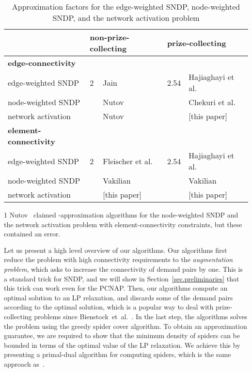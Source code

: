 \documentclass[11pt]{article}
\begin{document}
\begin{table*}
\centering
\caption{Approximation factors for the edge-weighted SNDP, node-weighted SNDP, and 
the network activation problem}
\label{table.results}

\begin{threeparttable}
\begin{tabular}{lllll}
\toprule
 & \multicolumn{2}{l}{non-prize-collecting} & \multicolumn{2}{l}{prize-collecting}\\
\midrule
{\bf edge-connectivity}&&&&\\
edge-weighted SNDP & 2 & Jain~\cite{Jain01} & 2.54 & Hajiaghayi et al.~\cite{HajiaghayiKKN12} \\
node-weighted SNDP & 
	 & Nutov~\cite{Nutov10node-weights} 
	&  & Chekuri et al.~\cite{ChekuriEV12}\\
network activation & 
	 & Nutov~\cite{Nutov13activation}
	&  & [this paper]\\
\midrule
{\bf element-connectivity}&&&&\\
edge-weighted SNDP
	& 2 & Fleischer et al.~\cite{FleischerJW06}
	& 2.54 &Hajiaghayi et al.~\cite{HajiaghayiKKN12}\\
node-weighted SNDP
	&  & Vakilian \cite{Vakilian13}\tnote{1}
	&  & Vakilian \cite{Vakilian13}\\
network activation  
 &  & [this paper]\tnote{1}
 &  & [this paper]\\
\bottomrule
\end{tabular}
\begin{tablenotes}\footnotesize
\item[1] Nutov~\cite{Nutov12uncrossable,Nutov13activation} claimed -approximation
algorithms for the node-weighted SNDP and the network activation problem with element-connectivity 
constraints, but these contained an error.
\end{tablenotes}
\end{threeparttable}
\end{table*}



Let us present a high level overview of our algorithms.
Our algorithms first reduce the problem with high connectivity requirements
to the \emph{augmentation problem},
which asks to increase the connectivity of demand pairs by one.
This is a standard trick for SNDP,
and we will show in Section~\ref{sec.preliminaries} that this trick can work
even for the PCNAP.
Then, our algorithms compute an optimal solution to an LP relaxation, and 
discards some of the demand pairs according to the optimal solution, 
which is a popular way to deal with prize-collecting problems
since Bienstock~et~al.~\cite{BienstockGSW93}.
In the last step, the algorithms solves the problem using the greedy spider cover algorithm.
To obtain an approximation guarantee, we are required to show that 
the minimum density of spiders can be bounded
in terms of the optimal value of the LP relaxation.
We achieve this by presenting a primal-dual algorithm for computing spiders,
which is the same approach as~\cite{ChekuriEV12,BateniHL13,Vakilian13}.
\end{document}
